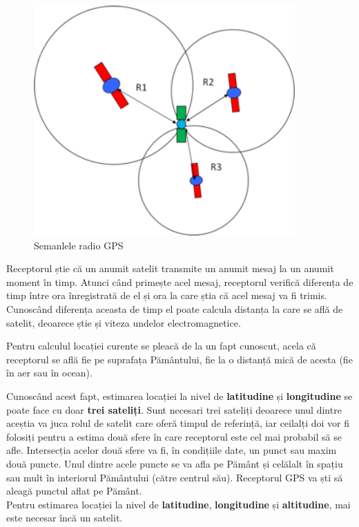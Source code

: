 \documentclass[12pt, a4paper, oneside]{article}
\begin{document}
\begin{figure}[h]
\centering
\includegraphics[width=10cm]{figures/gps_signals.png}
\caption{Semanlele radio GPS}
\label{fig:gps_signals}
\end{figure}

Receptorul știe că un anumit satelit transmite un anumit mesaj la un anumit moment în timp. Atunci când primește acel mesaj, receptorul verifică diferența de timp între ora înregistrată de el și ora la care știa că acel mesaj va fi trimis. Cunoscând diferența aceasta de timp el poate calcula distanța la care se află de satelit, deoarece știe și viteza undelor electromagnetice.

Pentru calculul locației curente se pleacă de la un fapt cunoscut, acela că receptorul se află fie pe suprafața Pământului, fie la o distanță mică de acesta (fie în aer sau în ocean).

Cunoscând acest fapt, estimarea locației la nivel de \textbf{latitudine} și \textbf{longitudine} se poate face cu doar \textbf{trei sateliți}. Sunt necesari trei sateliți deoarece unul dintre aceștia va juca rolul de satelit care oferă timpul de referință, iar ceilalți doi vor fi folosiți pentru a estima două sfere în care receptorul este cel mai probabil să se afle. Intersecția acelor două sfere va fi, în condițiile date, un punct sau maxim două puncte. Unul dintre acele puncte se va afla pe Pământ și celălalt în spațiu sau mult în interiorul Pământului (către centrul său). Receptorul GPS va ști să aleagă punctul aflat pe Pământ.\\

Pentru estimarea locației la nivel de \textbf{latitudine}, \textbf{longitudine} și \textbf{altitudine}, mai este necesar încă un satelit.
\end{document}
